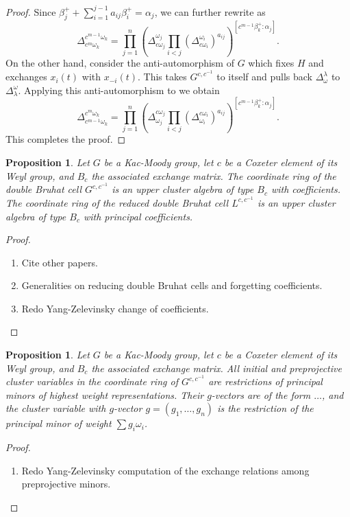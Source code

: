 \documentclass[12pt]{amsart}
\newtheorem{proposition}[theorem]{Proposition}
\numberwithin{equation}{section}
\begin{document}
\begin{proof}
    Since $\beta_j^+ + \sum_{i=1}^{j-1} a_{ij} \beta_i^+ = \alpha_j$, we can further rewrite  as
    \begin{equation}\label{eq:coeffident}
      \Delta_{c^m \omega_k}^{c^{m-1} \omega_k} = 
      \prod_{j=1}^n \left( \Delta_{c \omega_j}^{\omega_j} \prod_{i < j}(\Delta_{c \omega_i}^{\omega_i})^{a_{ij}}\right)^{[c^{m-1} \beta_k^+:\alpha_j]}. 
    \end{equation}
    On the other hand, consider the anti-automorphism of $G$ which fixes $H$ and exchanges $x_i(t)$ with $x_{-i}(t)$.  This takes $G^{c,c^{-1}}$ to itself and pulls back $\Delta_{\omega}^{\lambda}$ to $\Delta^{\omega}_{\lambda}$.  Applying this anti-automorphism to  we obtain
    \[
      \Delta^{c^m \omega_k}_{c^{m-1} \omega_k} = 
      \prod_{j=1}^n \left( \Delta^{c \omega_j}_{\omega_j} \prod_{i < j}(\Delta^{c \omega_i}_{\omega_i})^{a_{ij}}\right)^{[c^{m-1} \beta_k^+:\alpha_j]}.
    \]
    This completes the proof.
  \end{proof}

\begin{proposition}
Let $G$ be a Kac-Moody group, let $c$ be a Coxeter element of its Weyl group, and $B_c$ the associated exchange matrix.  The coordinate ring of the double Bruhat cell $G^{c,c^{-1}}$ is an upper cluster algebra of type $B_c$ with coefficients.  The coordinate ring of the reduced double Bruhat cell $L^{c,c^{-1}}$ is an upper cluster algebra of type $B_c$ with principal coefficients.
\end{proposition}
\begin{proof}
\begin{enumerate}
\item Cite other papers.
\item Generalities on reducing double Bruhat cells and forgetting coefficients.
\item Redo Yang-Zelevinsky change of coefficients.
\end{enumerate}
\end{proof}

\begin{proposition}
Let $G$ be a Kac-Moody group, let $c$ be a Coxeter element of its Weyl group, and $B_c$ the associated exchange matrix.  All initial and preprojective cluster variables in the coordinate ring of $G^{c,c^{-1}}$ are restrictions of principal minors of highest weight representations.  Their $g$-vectors are of the form $\dotsc$, and the cluster variable with $g$-vector $g = (g_1,\dotsc,g_n)$ is the restriction of the principal minor of weight $\sum g_i \omega_i$.
\end{proposition}
\begin{proof}
\begin{enumerate}
\item Redo Yang-Zelevinsky computation of the exchange relations among preprojective minors.
\end{enumerate}
\end{proof}
\end{document}
